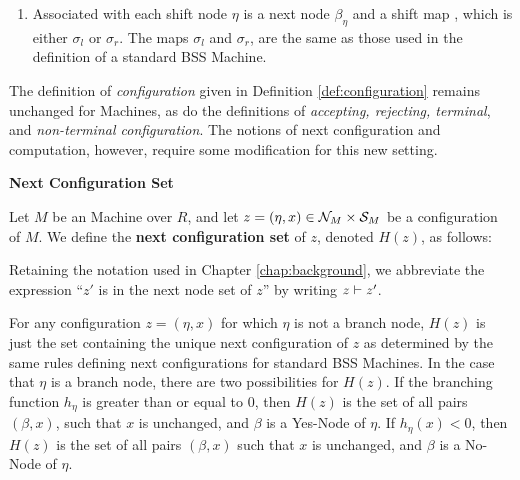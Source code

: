 \begin{definition}
\begin{enumerate}
  \item Associated with each shift node $\eta$ is a next node
    $\beta_\eta$ and a shift map
    , which is either
    $\sigma_l$ or $\sigma_r$. The maps $\sigma_l$ and $\sigma_r$, are
    the same as those used in the definition of a standard BSS
    Machine.

  \end{enumerate}
\end{definition}

The definition of \emph{configuration} given in Definition
\ref{def:configuration} remains unchanged for \ndet Machines, as do
the definitions of \emph{accepting, rejecting, terminal}, and
\emph{non-terminal configuration}. The notions of next configuration
and computation, however, require some modification for this new
setting.

\begin{definition}{\textbf{Next Configuration Set}}

  Let $M$ be an \ndet Machine over $R$, and let $z = (\eta, x) \in
  \mathcal{N}_M \times \mathcal{S}_M$ be a configuration of $M$.  We define
  the \textbf{next configuration set} of $z$, denoted $H(z)$, as
  follows:


  Retaining the notation used in Chapter \ref{chap:background}, we
  abbreviate the expression ``$z'$ is in the next node set of $z$'' by
  writing $z \vdash z'$.
\end{definition}

\vspace{\baselineskip}

For any configuration $z = (\eta, x)$ for which $\eta$ is not a branch
node, $H(z)$ is just the set containing the unique next configuration
of $z$ as determined by the same rules defining next configurations
for standard BSS Machines. In the case that $\eta$ is a branch node,
there are two possibilities for $H(z)$.  If the branching function
$h_\eta$ is greater than or equal to $0$, then $H(z)$ is the set of
all pairs $(\beta, x)$, such that $x$ is unchanged, and $\beta$ is a
Yes-Node of $\eta$.  If $h_\eta(x) < 0$, then $H(z)$ is the set of
all pairs $(\beta, x)$ such that $x$ is unchanged, and $\beta$ is a
No-Node of $\eta$.

